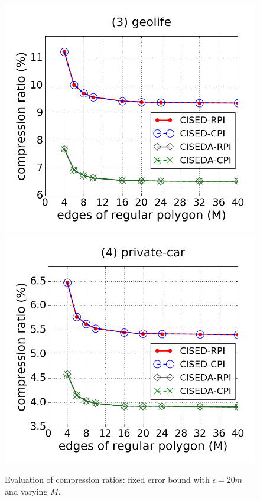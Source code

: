 \begin{figure}[tb!]
\includegraphics[scale = 0.250]{figures/Exp-M-e-20-CR-geolife.png}
\includegraphics[scale = 0.250]{figures/Exp-M-e-20-CR-private.png}
\vspace{-2ex}
\caption{\small Evaluation of compression ratios: fixed error bound with $\epsilon=20m$ and varying $M$.}
\label{fig:m-cr-e20}
\vspace{-1ex}
\end{figure}


